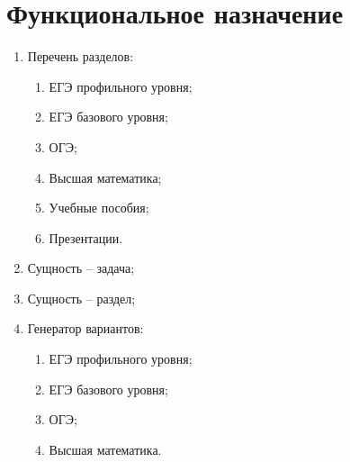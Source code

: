 \chapter{ Функциональное назначение }
\begin{enumerate}
	\item Перечень разделов:
	\begin{enumerate}
		\item ЕГЭ профильного уровня;
		\item ЕГЭ базового уровня;
		\item ОГЭ;
		\item Высшая математика;
		\item Учебные пособия;
		\item Презентации.
	\end{enumerate}
	\item Сущность -- задача;
	\item Сущность -- раздел;
	\item Генератор вариантов:
		\begin{enumerate}
			\item ЕГЭ профильного уровня;
			\item ЕГЭ базового уровня;
			\item ОГЭ;
			\item Высшая математика.
		\end{enumerate}
\end{enumerate}
